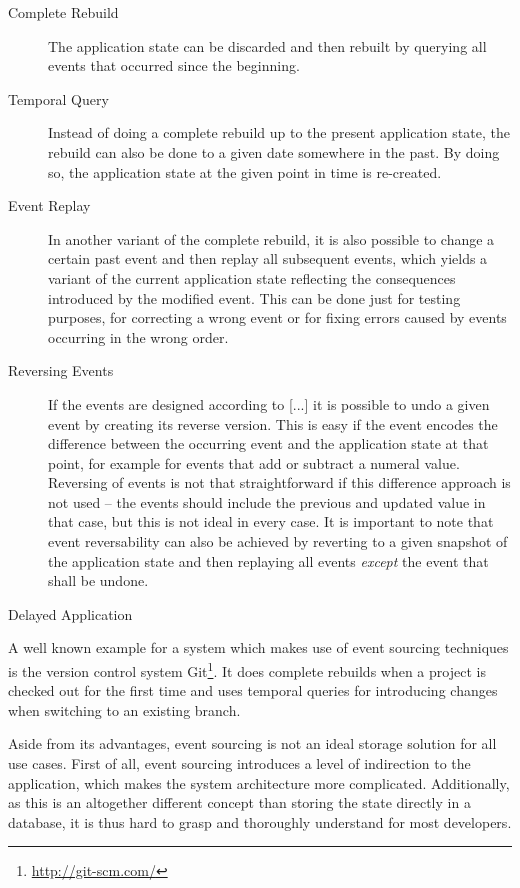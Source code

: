 \begin{description}
\item [Complete Rebuild]
The application state can be discarded and then rebuilt by querying all events that occurred since the beginning.
\item [Temporal Query]
Instead of doing a complete rebuild up to the present application state, the rebuild can also be done to a given date somewhere in the past.
By doing so, the application state at the given point in time is re-created.
\item [Event Replay]
In another variant of the complete rebuild, it is also possible to change a certain past event and then replay all subsequent events, which yields a variant of the current application state reflecting the consequences introduced by the modified event.
This can be done just for testing purposes, for correcting a wrong event or for fixing errors caused by events occurring in the wrong order.
\item [Reversing Events]
If the events are designed according to [...] it is possible to undo a given event by creating its reverse version.
This is easy if the event encodes the difference between the occurring event and the application state at that point, for example for events that add or subtract a numeral value.
Reversing of events is not that straightforward if this difference approach is not used -- the events should include the previous and updated value in that case, but this is not ideal in every case.
It is important to note that event reversability can also be achieved by reverting to a given snapshot of the application state and then replaying all events \emph{except} the event that shall be undone.
\item [Delayed Application]
\end{description}

A well known example for a system which makes use of event sourcing techniques is the version control system Git\footnote{\url{http://git-scm.com/}}.
It does complete rebuilds when a project is checked out for the first time and uses temporal queries for introducing changes when switching to an existing branch. 

Aside from its advantages, event sourcing is not an ideal storage solution for all use cases.
First of all, event sourcing introduces a level of indirection to the application, which makes the system architecture more complicated.
Additionally, as this is an altogether different concept than storing the state directly in a database, it is thus hard to grasp and thoroughly understand for most developers.

